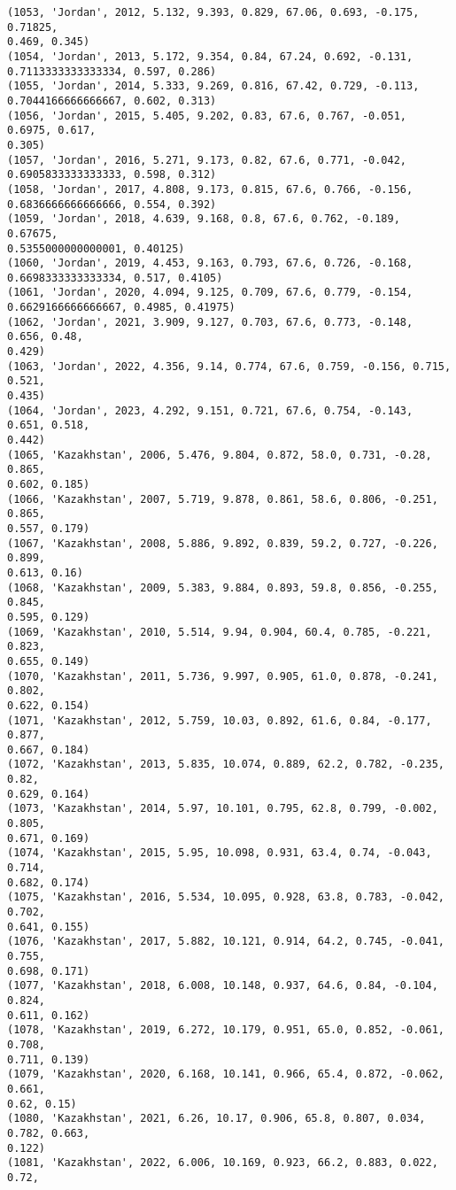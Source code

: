 \documentclass[11pt]{article}
\begin{document}
\begin{Verbatim}[commandchars=\\\{\}]
(1053, 'Jordan', 2012, 5.132, 9.393, 0.829, 67.06, 0.693, -0.175, 0.71825,
0.469, 0.345)
(1054, 'Jordan', 2013, 5.172, 9.354, 0.84, 67.24, 0.692, -0.131,
0.7113333333333334, 0.597, 0.286)
(1055, 'Jordan', 2014, 5.333, 9.269, 0.816, 67.42, 0.729, -0.113,
0.7044166666666667, 0.602, 0.313)
(1056, 'Jordan', 2015, 5.405, 9.202, 0.83, 67.6, 0.767, -0.051, 0.6975, 0.617,
0.305)
(1057, 'Jordan', 2016, 5.271, 9.173, 0.82, 67.6, 0.771, -0.042,
0.6905833333333333, 0.598, 0.312)
(1058, 'Jordan', 2017, 4.808, 9.173, 0.815, 67.6, 0.766, -0.156,
0.6836666666666666, 0.554, 0.392)
(1059, 'Jordan', 2018, 4.639, 9.168, 0.8, 67.6, 0.762, -0.189, 0.67675,
0.5355000000000001, 0.40125)
(1060, 'Jordan', 2019, 4.453, 9.163, 0.793, 67.6, 0.726, -0.168,
0.6698333333333334, 0.517, 0.4105)
(1061, 'Jordan', 2020, 4.094, 9.125, 0.709, 67.6, 0.779, -0.154,
0.6629166666666667, 0.4985, 0.41975)
(1062, 'Jordan', 2021, 3.909, 9.127, 0.703, 67.6, 0.773, -0.148, 0.656, 0.48,
0.429)
(1063, 'Jordan', 2022, 4.356, 9.14, 0.774, 67.6, 0.759, -0.156, 0.715, 0.521,
0.435)
(1064, 'Jordan', 2023, 4.292, 9.151, 0.721, 67.6, 0.754, -0.143, 0.651, 0.518,
0.442)
(1065, 'Kazakhstan', 2006, 5.476, 9.804, 0.872, 58.0, 0.731, -0.28, 0.865,
0.602, 0.185)
(1066, 'Kazakhstan', 2007, 5.719, 9.878, 0.861, 58.6, 0.806, -0.251, 0.865,
0.557, 0.179)
(1067, 'Kazakhstan', 2008, 5.886, 9.892, 0.839, 59.2, 0.727, -0.226, 0.899,
0.613, 0.16)
(1068, 'Kazakhstan', 2009, 5.383, 9.884, 0.893, 59.8, 0.856, -0.255, 0.845,
0.595, 0.129)
(1069, 'Kazakhstan', 2010, 5.514, 9.94, 0.904, 60.4, 0.785, -0.221, 0.823,
0.655, 0.149)
(1070, 'Kazakhstan', 2011, 5.736, 9.997, 0.905, 61.0, 0.878, -0.241, 0.802,
0.622, 0.154)
(1071, 'Kazakhstan', 2012, 5.759, 10.03, 0.892, 61.6, 0.84, -0.177, 0.877,
0.667, 0.184)
(1072, 'Kazakhstan', 2013, 5.835, 10.074, 0.889, 62.2, 0.782, -0.235, 0.82,
0.629, 0.164)
(1073, 'Kazakhstan', 2014, 5.97, 10.101, 0.795, 62.8, 0.799, -0.002, 0.805,
0.671, 0.169)
(1074, 'Kazakhstan', 2015, 5.95, 10.098, 0.931, 63.4, 0.74, -0.043, 0.714,
0.682, 0.174)
(1075, 'Kazakhstan', 2016, 5.534, 10.095, 0.928, 63.8, 0.783, -0.042, 0.702,
0.641, 0.155)
(1076, 'Kazakhstan', 2017, 5.882, 10.121, 0.914, 64.2, 0.745, -0.041, 0.755,
0.698, 0.171)
(1077, 'Kazakhstan', 2018, 6.008, 10.148, 0.937, 64.6, 0.84, -0.104, 0.824,
0.611, 0.162)
(1078, 'Kazakhstan', 2019, 6.272, 10.179, 0.951, 65.0, 0.852, -0.061, 0.708,
0.711, 0.139)
(1079, 'Kazakhstan', 2020, 6.168, 10.141, 0.966, 65.4, 0.872, -0.062, 0.661,
0.62, 0.15)
(1080, 'Kazakhstan', 2021, 6.26, 10.17, 0.906, 65.8, 0.807, 0.034, 0.782, 0.663,
0.122)
(1081, 'Kazakhstan', 2022, 6.006, 10.169, 0.923, 66.2, 0.883, 0.022, 0.72,

\end{Verbatim}
\end{document}
